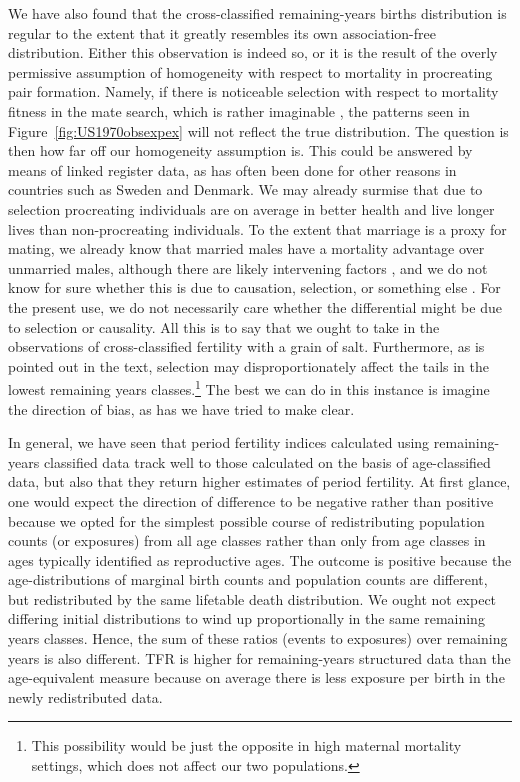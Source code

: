We have also found that the cross-classified remaining-years births distribution
is regular to the extent that it greatly resembles its own association-free
distribution. Either this observation is indeed so, or it is the result of the
overly permissive assumption of homogeneity with respect to mortality in
procreating pair formation. Namely, if there is noticeable selection with
respect to mortality fitness in the mate search, which is rather imaginable
\citep{gangestad1993pathogen, roberts2008good}, the patterns seen in
Figure~\ref{fig:US1970obsexpex} will not reflect the true distribution. The
question is then how far off our homogeneity assumption is. This could be
answered by means of linked register data, as has often been done for
other reasons in countries such as Sweden and Denmark. We may already surmise
that due to selection procreating individuals are on average in better health and live
longer lives than non-procreating individuals. To the extent that marriage 
is a proxy for mating, we already know that married males have a
mortality advantage over unmarried males, although
there are likely intervening factors \citep[see
e.g.,][]{rogers1995marriage, waite1995does}, and we do not know for sure whether
this is due to causation, selection, or something else \citep[see
e.g.,][]{goldman1993marriage}. For the present use, we do not necessarily care 
whether the differential might be due to
selection or causality. All this is to say that we ought to take in the
observations of cross-classified fertility with a grain of salt. Furthermore, as
is pointed out in the text, selection may disproportionately affect the tails 
in the lowest remaining years classes.\footnote{This possibility would be just
the opposite in high maternal mortality settings, which does not affect
our two populations.} The best we can do in this instance is imagine the
direction of bias, as has we have tried to make clear.

In general, we have seen that period fertility indices calculated using
remaining-years classified data track well to those calculated on
the basis of age-classified data, but also that they return higher estimates of
period fertility. At first glance, one would expect the direction of difference to be negative 
rather than positive because we opted for the simplest possible course of
redistributing population counts (or exposures) from all age classes rather than
only from age classes in ages typically identified as reproductive ages. The
outcome is positive because the age-distributions of marginal birth counts and
population counts are different, but redistributed by the same lifetable death
distribution. We ought not expect differing initial distributions to wind up
proportionally in the same remaining years classes. Hence, the sum of these
ratios (events to exposures) over remaining years is also different. TFR is higher for remaining-years structured data than the age-equivalent
measure because on average there is less exposure per birth in the newly
redistributed data.

